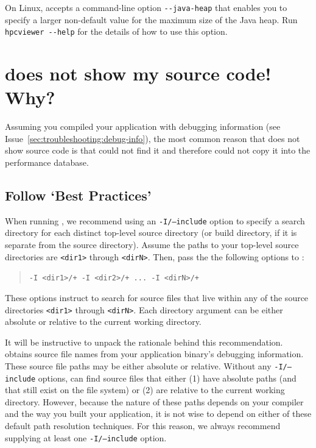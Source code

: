 \documentclass[11pt,letterpaper]{report}
\begin{document}
On Linux, \hpcviewer{} accepts a command-line option \verb|--java-heap| that enables you to specify a larger non-default value for the maximum size of the Java heap. Run \verb|hpcviewer --help| for the details of how to use this option.



\section{\hpcviewer{} does not show my source code! Why?}


Assuming you compiled your application with debugging information (see Issue~\ref{sec:troubleshooting:debug-info}), the most common reason that \hpcviewer{} does not show source code is that \hpcprofAll{} could not find it and therefore could not copy it into the \HPCToolkit{} performance database.




\subsection{Follow `Best Practices'}

When running \hpcprofAll{}, we recommend using an \texttt{-I/--include} option to specify a search directory for each distinct top-level source directory (or build directory, if it is separate from the source directory).
Assume the paths to your top-level source directories are \texttt{<dir1>} through \texttt{<dirN>}.
Then, pass the the following options to \hpcprofAll{}:
\begin{quote}
  \verb|-I <dir1>/+ -I <dir2>/+ ... -I <dirN>/+|
\end{quote}
These options instruct \hpcprofAll{} to search for source files that live within any of the source directories \texttt{<dir1>} through \texttt{<dirN>}.
Each directory argument can be either absolute or relative to the current working directory.

It will be instructive to unpack the rationale behind this recommendation.
\hpcprofAll{} obtains source file names from your application binary's debugging information.
These source file paths may be either absolute or relative.
Without any \texttt{-I/--include} options, \hpcprofAll{} can find source files that either (1) have absolute paths (and that still exist on the file system) or (2) are relative to the current working directory.
However, because the nature of these paths depends on your compiler and the way you built your application, it is not wise to depend on either of these default path resolution techniques.
For this reason, we always recommend supplying at least one \texttt{-I/--include} option.
\end{document}
